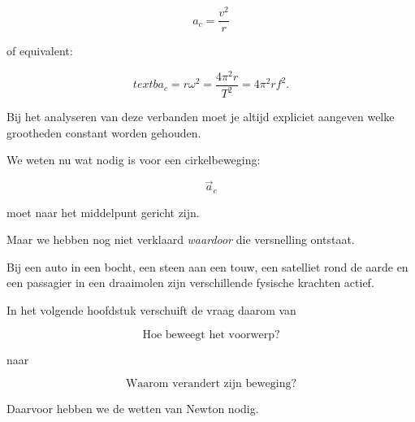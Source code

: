 \documentclass{ximera}
\begin{document}
\[
\boxed{
a_c=\frac{v^2}{r}
}
\]

of equivalent:

\[
\boxed{textb
a_c=r\omega^2
=\frac{4\pi^2r}{T^2}
=4\pi^2rf^2.
}
\]

Bij het analyseren van deze verbanden moet je altijd expliciet aangeven
welke grootheden constant worden gehouden.







We weten nu wat nodig is voor een cirkelbeweging:

\[
\vec a_c
\]

moet naar het middelpunt gericht zijn.

Maar we hebben nog niet verklaard \emph{waardoor} die versnelling
ontstaat.

Bij een auto in een bocht, een steen aan een touw, een satelliet rond
de aarde en een passagier in een draaimolen zijn verschillende
fysische krachten actief.

In het volgende hoofdstuk verschuift de vraag daarom van

\[
\boxed{\text{Hoe beweegt het voorwerp?}}
\]

naar

\[
\boxed{\text{Waarom verandert zijn beweging?}}
\]

Daarvoor hebben we de wetten van Newton nodig.
\end{document}
